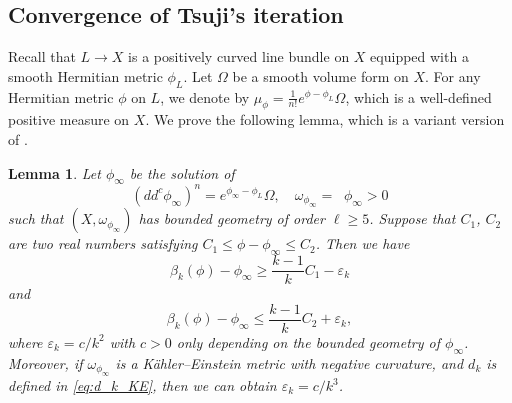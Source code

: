 \documentclass[a4paper, 11pt]{amsart}
\theoremstyle{plain}
\numberwithin{equation}{section} %
\numberwithin{figure}{section} %
\theoremstyle{plain}
\theoremstyle{plain}
\theoremstyle{plain}
\theoremstyle{plain}
\newtheorem{lemma}[theorem]{Lemma} %
\theoremstyle{remark}
\theoremstyle{definition}
\theoremstyle{definition}
\DeclareMathOperator \ddc{\textrm{dd}^c}
\begin{document}
\subsection{ Convergence of Tsuji’s iteration}
 Recall that $L\to X$ is a positively curved line bundle on $X$ equipped with a smooth Hermitian metric $\phi_L$. Let $\Omega$ be a smooth volume form on $X$. For any Hermitian metric $\phi$ on $L$, we denote by $\mu_\phi=\frac{1}{n!}e^{\phi-\phi_L}\Omega$, which is a well-defined positive measure on $X$. We prove the following lemma,  which is a variant version of \cite[Lemma 3]{berndtsson09-remarks-tsuji'}.
\begin{lemma}
\label{lem_key}
Let $\phi_\infty$ be the solution of
$$ (dd^c\phi_{\infty})^n=e^{\phi_{\infty}-\phi_L}\Omega,\quad\omega_{\phi_{\infty}}=\ddc\phi_\infty>0$$ such that $(X,\omega_{\phi_\infty})$ has bounded geometry of order $\ell\geq 5$.
Suppose that  $C_1$, $C_2$ are two real numbers  satisfying $C_1\leq \phi -\phi_{\infty}\leq C_2 $. 
Then   we  have
\begin{equation}
\label{est_1}
\beta_k(\phi)-\phi_{\infty}\geq  \frac{k-1}{k}C_1 - \varepsilon_k
\end{equation}
and
\begin{equation}
\label{est_2}
\beta_k(\phi)-\phi_{\infty}\leq   \frac{k-1}{k}C_2+ \varepsilon_k,
\end{equation}
where  $\varepsilon_k= c/k^2$ with $c>0$ only depending on the bounded geometry of $\phi_{\infty}$. Moreover, if $\omega_{\phi_\infty}$ is a K\"ahler--Einstein metric with negative curvature, and  $d_k$ is defined in \eqref{eq:d_k_KE}, then we can obtain $\varepsilon_k=c/k^3$.
\end{lemma}
\end{document}
